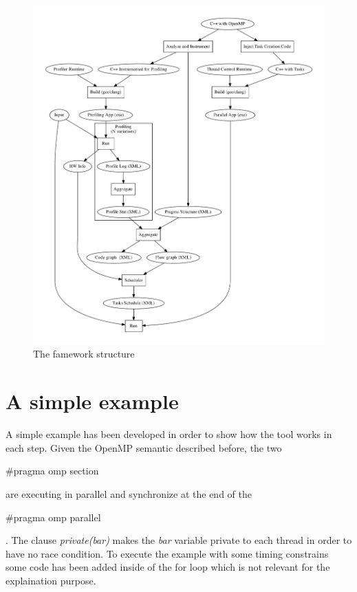 \documentclass[a4paper,12pt,oneside]{book}
\begin{document}
\begin{figure}[H]
\centering
\includegraphics[scale=0.40]{tgraph.pdf}
\caption{The famework structure}
\label{framework}
\end{figure}


\section{A simple example}
\label{example}
A simple example has been developed in order to show how the tool works in each step. Given the OpenMP semantic described before, the two \begin{bf}$\#$pragma omp section\end{bf} are executing in parallel and synchronize at the end of the \begin{bf}$\#$pragma omp parallel\end{bf}. The clause \emph{private(bar)} makes the \emph{bar} variable private to each thread in order to have no race condition. To execute the example with some timing constrains some code has been added inside of the for loop which is not relevant for the explaination purpose.
\end{document}

